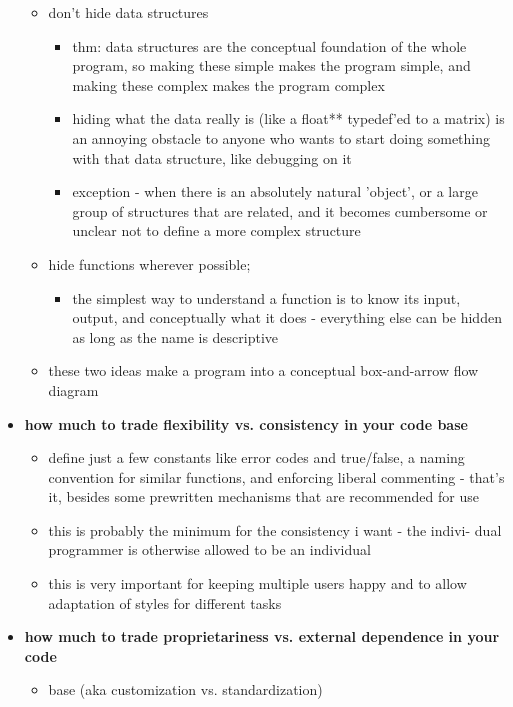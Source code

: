 \begin{itemize}
	\begin{itemize}
	\item don't hide data structures
		\begin{itemize}
		\item thm: data structures are the conceptual foundation of the whole
				program, so making these simple makes the program simple, and
				making these complex makes the program complex
		\item hiding what the data really is (like a float** typedef'ed to a
				matrix) is an annoying obstacle to anyone who wants to start
				doing something with that data structure, like debugging on it
		\item exception - when there is an absolutely natural 'object', or a
				large group of structures that are related, and it becomes 
				cumbersome or unclear not to define a more complex structure
		\end{itemize}
	\item hide functions wherever possible;
		\begin{itemize}
		\item the simplest way to understand a function is to know its input, 
				output, and conceptually what it does - everything else can be
				hidden as long as the name is descriptive
		\end{itemize}
	\item these two ideas make a program into a conceptual box-and-arrow flow
			diagram
	\end{itemize}
\item {\bf how much to trade flexibility vs. consistency in your code base}
	\begin{itemize}
	\item define just a few constants like error codes and true/false, a 
			naming convention for similar functions, and enforcing liberal
			commenting - that's it, besides some prewritten mechanisms that are
			recommended for use
	\item this is probably the minimum for the consistency i want - the indivi-
			dual programmer is otherwise allowed to be an individual
	\item this is very important for keeping multiple users happy and to allow
			adaptation of styles for different tasks
	\end{itemize}
\item {\bf how much to trade proprietariness vs. external dependence in your 
	code}
	\begin{itemize}
	\item base (aka customization vs. standardization)

\end{itemize}
\end{itemize}
